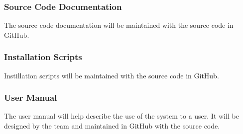 \subsubsection{Source Code Documentation}

The source code documentation will be maintained with the source code in GitHub.

\subsubsection{Installation Scripts}

Instillation scripts will be maintained with the source code in GitHub.

\subsubsection{User Manual}

The user manual will help describe the use of the system to a user. It will be designed by the team and maintained in GitHub with the source code.